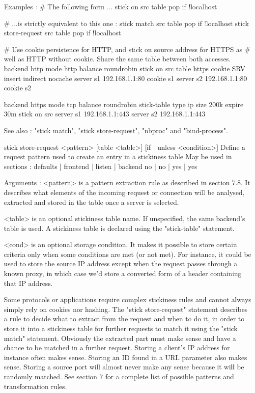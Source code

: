   Examples :
    # The following form ...
    stick on src table pop if !localhost

    # ...is strictly equivalent to this one :
    stick match src table pop if !localhost
    stick store-request src table pop if !localhost


    # Use cookie persistence for HTTP, and stick on source address for HTTPS as
    # well as HTTP without cookie. Share the same table between both accesses.
    backend http
        mode http
        balance roundrobin
        stick on src table https
        cookie SRV insert indirect nocache
        server s1 192.168.1.1:80 cookie s1
        server s2 192.168.1.1:80 cookie s2

    backend https
        mode tcp
        balance roundrobin
        stick-table type ip size 200k expire 30m
        stick on src
        server s1 192.168.1.1:443
        server s2 192.168.1.1:443

  See also : "stick match", "stick store-request", "nbproc" and "bind-process".


stick store-request <pattern> [table <table>] [{if | unless} <condition>]
  Define a request pattern used to create an entry in a stickiness table
  May be used in sections :   defaults | frontend | listen | backend
                                 no    |    no    |   yes  |   yes

  Arguments :
    <pattern>  is a pattern extraction rule as described in section 7.8. It
               describes what elements of the incoming request or connection
               will be analysed, extracted and stored in the table once a
               server is selected.

    <table>    is an optional stickiness table name. If unspecified, the same
               backend's table is used. A stickiness table is declared using
               the "stick-table" statement.

    <cond>     is an optional storage condition. It makes it possible to store
               certain criteria only when some conditions are met (or not met).
               For instance, it could be used to store the source IP address
               except when the request passes through a known proxy, in which
               case we'd store a converted form of a header containing that IP
               address.

  Some protocols or applications require complex stickiness rules and cannot
  always simply rely on cookies nor hashing. The "stick store-request" statement
  describes a rule to decide what to extract from the request and when to do
  it, in order to store it into a stickiness table for further requests to
  match it using the "stick match" statement. Obviously the extracted part must
  make sense and have a chance to be matched in a further request. Storing a
  client's IP address for instance often makes sense. Storing an ID found in a
  URL parameter also makes sense. Storing a source port will almost never make
  any sense because it will be randomly matched. See section 7 for a complete
  list of possible patterns and transformation rules.

